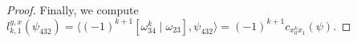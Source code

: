 \documentclass[a4paper,fleqn]{cas-sc}
\begin{document}
\begin{proof}






Finally, we compute $l^{y,x}_{k,1}(\psi_{432})=\langle (-1)^{k+1}[\omega^k_{34}\mid \omega_{23}], \psi_{432}\rangle=(-1)^{k+1}c_{x^k_0x_1}(\psi).$
\end{proof}
\end{document}
